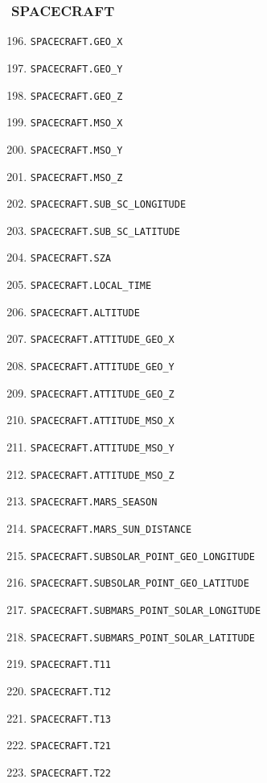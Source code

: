 \documentclass{article}
\begin{document}
\subsubsection{SPACECRAFT}
\begin{enumerate}
\setcounter{enumi}{195}
    \item \texttt{SPACECRAFT.GEO\_X}
    \item \texttt{SPACECRAFT.GEO\_Y}
    \item \texttt{SPACECRAFT.GEO\_Z}
    \item \texttt{SPACECRAFT.MSO\_X}
    \item \texttt{SPACECRAFT.MSO\_Y}
    \item \texttt{SPACECRAFT.MSO\_Z}
    \item \texttt{SPACECRAFT.SUB\_SC\_LONGITUDE}
    \item \texttt{SPACECRAFT.SUB\_SC\_LATITUDE}
    \item \texttt{SPACECRAFT.SZA}
    \item \texttt{SPACECRAFT.LOCAL\_TIME}
    \item \texttt{SPACECRAFT.ALTITUDE}
    \item \texttt{SPACECRAFT.ATTITUDE\_GEO\_X}
    \item \texttt{SPACECRAFT.ATTITUDE\_GEO\_Y}
    \item \texttt{SPACECRAFT.ATTITUDE\_GEO\_Z}
    \item \texttt{SPACECRAFT.ATTITUDE\_MSO\_X}
    \item \texttt{SPACECRAFT.ATTITUDE\_MSO\_Y}
    \item \texttt{SPACECRAFT.ATTITUDE\_MSO\_Z}
    \item \texttt{SPACECRAFT.MARS\_SEASON}
    \item \texttt{SPACECRAFT.MARS\_SUN\_DISTANCE}
    \item \texttt{SPACECRAFT.SUBSOLAR\_POINT\_GEO\_LONGITUDE}
    \item \texttt{SPACECRAFT.SUBSOLAR\_POINT\_GEO\_LATITUDE}
    \item \texttt{SPACECRAFT.SUBMARS\_POINT\_SOLAR\_LONGITUDE}
    \item \texttt{SPACECRAFT.SUBMARS\_POINT\_SOLAR\_LATITUDE}
    \item \texttt{SPACECRAFT.T11}
    \item \texttt{SPACECRAFT.T12}
    \item \texttt{SPACECRAFT.T13}
    \item \texttt{SPACECRAFT.T21}
    \item \texttt{SPACECRAFT.T22}

\end{enumerate}
\end{document}
